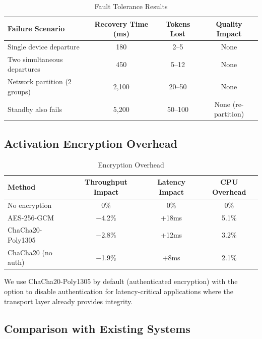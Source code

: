 \documentclass[11pt,a4paper]{article}
\begin{document}
\begin{table}[H]
\centering
\caption{Fault Tolerance Results}
\label{tab:fault}
\begin{tabular}{lccc}
\toprule
\textbf{Failure Scenario} & \textbf{Recovery Time (ms)} & \textbf{Tokens Lost} & \textbf{Quality Impact} \\
\midrule
Single device departure & 180 & 2--5 & None \\
Two simultaneous departures & 450 & 5--12 & None \\
Network partition (2 groups) & 2{,}100 & 20--50 & None \\
Standby also fails & 5{,}200 & 50--100 & None (re-partition) \\
\bottomrule
\end{tabular}
\end{table}

\subsection{Activation Encryption Overhead}

\begin{table}[H]
\centering
\caption{Encryption Overhead}
\label{tab:encryption}
\begin{tabular}{lccc}
\toprule
\textbf{Method} & \textbf{Throughput Impact} & \textbf{Latency Impact} & \textbf{CPU Overhead} \\
\midrule
No encryption & 0\% & 0\% & 0\% \\
AES-256-GCM & $-$4.2\% & +18ms & 5.1\% \\
ChaCha20-Poly1305 & $-$2.8\% & +12ms & 3.2\% \\
ChaCha20 (no auth) & $-$1.9\% & +8ms & 2.1\% \\
\bottomrule
\end{tabular}
\end{table}

We use ChaCha20-Poly1305 by default (authenticated encryption) with the option to disable authentication for latency-critical applications where the transport layer already provides integrity.

\subsection{Comparison with Existing Systems}
\end{document}

